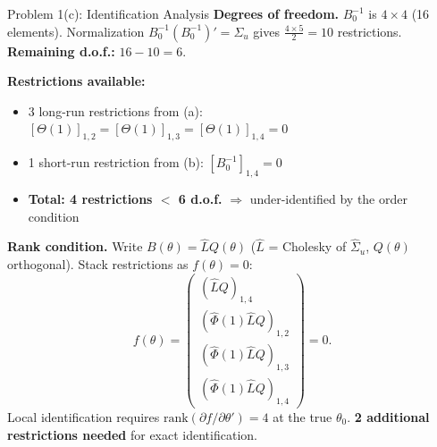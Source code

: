 \documentclass[aspectratio=169,11pt]{beamer}
\newcommand{\rank}{\mathrm{rank}}
\begin{document}
\begin{frame}{Problem 1(c): Identification Analysis}
    \textbf{Degrees of freedom.} $B_0^{-1}$ is $4\times 4$ (16 elements). Normalization $B_0^{-1}(B_0^{-1})' = \Sigma_u$ gives $\frac{4\times 5}{2} = 10$ restrictions. \textbf{Remaining d.o.f.:} $16 - 10 = 6$.

    \vspace{0.3em}
    \textbf{Restrictions available:}
    \begin{itemize}
        \item 3 long-run restrictions from (a): $[\Theta(1)]_{1,2}=[\Theta(1)]_{1,3}=[\Theta(1)]_{1,4}=0$
        \item 1 short-run restriction from (b): $[B_0^{-1}]_{1,4}=0$
        \item \textbf{Total: 4 restrictions $<$ 6 d.o.f.} $\Rightarrow$ \textcolor{mitred}{under-identified by the order condition}
    \end{itemize}

    \vspace{0.3em}
    \textbf{Rank condition.} Write $B(\theta) = \hat{L}Q(\theta)$ ($\hat{L}$ = Cholesky of $\hat\Sigma_u$, $Q(\theta)$ orthogonal). Stack restrictions as $f(\theta) = 0$:
    \[
    f(\theta) = \begin{pmatrix} (\hat{L}Q)_{1,4} \\ (\hat\Phi(1)\hat{L}Q)_{1,2} \\ (\hat\Phi(1)\hat{L}Q)_{1,3} \\ (\hat\Phi(1)\hat{L}Q)_{1,4} \end{pmatrix} = 0.
    \]
    Local identification requires $\rank\!\left(\partial f/\partial\theta'\right) = 4$ at the true $\theta_0$. \textbf{2 additional restrictions needed} for exact identification.
\end{frame}
\end{document}
